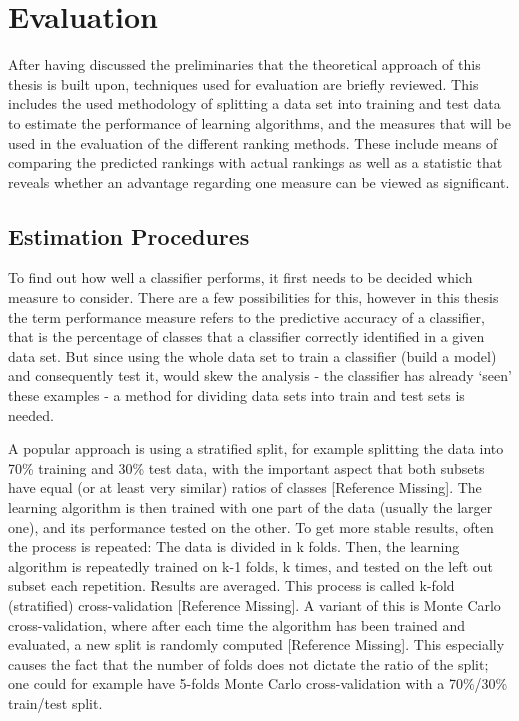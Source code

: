 \section{Evaluation}

After having discussed the preliminaries that the theoretical approach of this thesis is built upon, techniques used for evaluation are briefly reviewed. This includes the used methodology of splitting a data set into training and test data to estimate the performance of learning algorithms, and the measures that will be used in the evaluation of the different ranking methods. These include means of comparing the predicted rankings with actual rankings as well as a statistic that reveals whether an advantage regarding one measure can be viewed as significant.

\subsection{Estimation Procedures}

To find out how well a classifier performs, it first needs to be decided which measure to consider. There are a few possibilities for this, however in this thesis the term performance measure refers to the predictive accuracy of a classifier, that is the percentage of classes that a classifier correctly identified in a given data set. But since using the whole data set to train a classifier (build a model) and consequently test it, would skew the analysis - the classifier has already `seen' these examples - a method for dividing data sets into train and test sets is needed. 

A popular approach is using a stratified split, for example splitting the data into 70\% training and 30\% test data, with the important aspect that both subsets have equal (or at least very similar) ratios of classes [Reference Missing]. The learning algorithm is then trained with one part of the data (usually the larger one), and its performance tested on the other. To get more stable results, often the process is repeated: The data is divided in k folds. Then, the learning algorithm is repeatedly trained on k-1 folds, k times, and tested on the left out subset each repetition. Results are averaged. This process is called k-fold (stratified) cross-validation [Reference Missing]. A variant of this is Monte Carlo cross-validation, where after each time the algorithm has been trained and evaluated, a new split is randomly computed [Reference Missing]. This especially causes the fact that the number of folds does not dictate the ratio of the split; one could for example have 5-folds Monte Carlo cross-validation with a 70\%/30\% train/test split.

